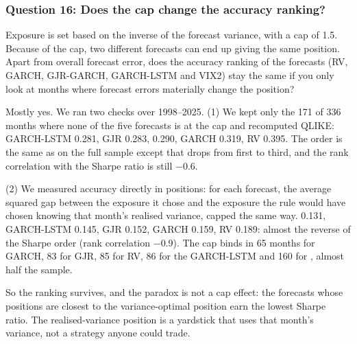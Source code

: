 \subsubsection*{Question 16: Does the cap change the accuracy ranking?}
\begin{question}
Exposure is set based on the inverse of the forecast variance, with a cap of 1.5. Because of the cap, two different forecasts can end up giving the same position. Apart from overall forecast error, does the accuracy ranking of the forecasts (RV, GARCH, GJR-GARCH, GARCH-LSTM and VIX2) stay the same if you only look at months where forecast errors materially change the position?
\end{question}
Mostly yes. We ran two checks over 1998--2025. (1) We kept only the 171 of 336 months where none of the five forecasts is at the cap and recomputed QLIKE: GARCH-LSTM 0.281, GJR 0.283, \VIX{} 0.290, GARCH 0.319, RV 0.395. The order is the same as on the full sample except that \VIX{} drops from first to third, and the rank correlation with the Sharpe ratio is still $-$0.6.

(2) We measured accuracy directly in positions: for each forecast, the average squared gap between the exposure it chose and the exposure the rule would have chosen knowing that month's realised variance, capped the same way. \VIX{} 0.131, GARCH-LSTM 0.145, GJR 0.152, GARCH 0.159, RV 0.189: almost the reverse of the Sharpe order (rank correlation $-$0.9). The cap binds in 65 months for GARCH, 83 for GJR, 85 for RV, 86 for the GARCH-LSTM and 160 for \VIX, almost half the sample.

So the ranking survives, and the paradox is not a cap effect: the forecasts whose positions are closest to the variance-optimal position earn the lowest Sharpe ratio. The realised-variance position is a yardstick that uses that month's variance, not a strategy anyone could trade.

